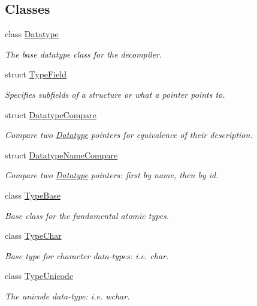 \subsection*{Classes}
\begin{DoxyCompactItemize}
\item 
class \mbox{\hyperlink{class_datatype}{Datatype}}
\begin{DoxyCompactList}\small\item\em The base datatype class for the decompiler. \end{DoxyCompactList}\item 
struct \mbox{\hyperlink{struct_type_field}{Type\+Field}}
\begin{DoxyCompactList}\small\item\em Specifies subfields of a structure or what a pointer points to. \end{DoxyCompactList}\item 
struct \mbox{\hyperlink{struct_datatype_compare}{Datatype\+Compare}}
\begin{DoxyCompactList}\small\item\em Compare two \mbox{\hyperlink{class_datatype}{Datatype}} pointers for equivalence of their description. \end{DoxyCompactList}\item 
struct \mbox{\hyperlink{struct_datatype_name_compare}{Datatype\+Name\+Compare}}
\begin{DoxyCompactList}\small\item\em Compare two \mbox{\hyperlink{class_datatype}{Datatype}} pointers\+: first by name, then by id. \end{DoxyCompactList}\item 
class \mbox{\hyperlink{class_type_base}{Type\+Base}}
\begin{DoxyCompactList}\small\item\em Base class for the fundamental atomic types. \end{DoxyCompactList}\item 
class \mbox{\hyperlink{class_type_char}{Type\+Char}}
\begin{DoxyCompactList}\small\item\em Base type for character data-\/types\+: i.\+e. char. \end{DoxyCompactList}\item 
class \mbox{\hyperlink{class_type_unicode}{Type\+Unicode}}
\begin{DoxyCompactList}\small\item\em The unicode data-\/type\+: i.\+e. wchar. \end{DoxyCompactList}\item 

\end{DoxyCompactItemize}
